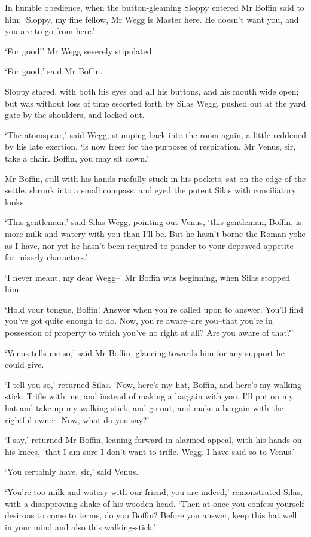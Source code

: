 In humble obedience, when the button-gleaming Sloppy entered Mr Boffin
said to him: ‘Sloppy, my fine fellow, Mr Wegg is Master here. He doesn’t
want you, and you are to go from here.’

‘For good!’ Mr Wegg severely stipulated.

‘For good,’ said Mr Boffin.

Sloppy stared, with both his eyes and all his buttons, and his mouth
wide open; but was without loss of time escorted forth by Silas Wegg,
pushed out at the yard gate by the shoulders, and locked out.

‘The atomspear,’ said Wegg, stumping back into the room again, a
little reddened by his late exertion, ‘is now freer for the purposes of
respiration. Mr Venus, sir, take a chair. Boffin, you may sit down.’

Mr Boffin, still with his hands ruefully stuck in his pockets, sat on
the edge of the settle, shrunk into a small compass, and eyed the potent
Silas with conciliatory looks.

‘This gentleman,’ said Silas Wegg, pointing out Venus, ‘this gentleman,
Boffin, is more milk and watery with you than I’ll be. But he hasn’t
borne the Roman yoke as I have, nor yet he hasn’t been required to
pander to your depraved appetite for miserly characters.’

‘I never meant, my dear Wegg--’ Mr Boffin was beginning, when Silas
stopped him.

‘Hold your tongue, Boffin! Answer when you’re called upon to answer.
You’ll find you’ve got quite enough to do. Now, you’re aware--are
you--that you’re in possession of property to which you’ve no right at
all? Are you aware of that?’

‘Venus tells me so,’ said Mr Boffin, glancing towards him for any
support he could give.

‘I tell you so,’ returned Silas. ‘Now, here’s my hat, Boffin, and here’s
my walking-stick. Trifle with me, and instead of making a bargain with
you, I’ll put on my hat and take up my walking-stick, and go out, and
make a bargain with the rightful owner. Now, what do you say?’

‘I say,’ returned Mr Boffin, leaning forward in alarmed appeal, with his
hands on his knees, ‘that I am sure I don’t want to trifle. Wegg. I have
said so to Venus.’

‘You certainly have, sir,’ said Venus.

‘You’re too milk and watery with our friend, you are indeed,’
remonstrated Silas, with a disapproving shake of his wooden head. ‘Then
at once you confess yourself desirous to come to terms, do you Boffin?
Before you answer, keep this hat well in your mind and also this
walking-stick.’

